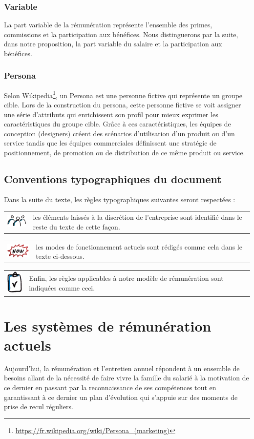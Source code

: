 \documentclass[12pt]{article}
\newcommand{\assemblee}[1]{%
  \begin{tcolorbox}[colframe=DarkPlum,boxrule=2pt,arc=4pt,left=6pt,right=6pt,top=6pt,bottom=6pt,boxsep=0pt,colback=Aluminium1]
    \begin{tabular}{m{1.5cm} m{11cm}}
      \includegraphics[width=1.5cm]{includes/team} & #1 \\
    \end{tabular}
  \end{tcolorbox}
}
\newcommand{\actuel}[1]{%
  \begin{tcolorbox}[colframe=DarkButter,boxrule=2pt,arc=4pt,left=6pt,right=6pt,top=6pt,bottom=6pt,boxsep=0pt,colback=Aluminium1]
    \begin{tabular}{m{1.5cm} m{11cm}}
      \includegraphics[width=1.5cm]{includes/now} & #1 \\
    \end{tabular}
  \end{tcolorbox}
}
\newcommand{\regle}[1]{%
  \begin{tcolorbox}[colframe=DarkOrange,boxrule=2pt,arc=4pt,left=6pt,right=6pt,top=6pt,bottom=6pt,boxsep=0pt,colback=Aluminium1]
    \begin{tabular}{m{1.0cm} m{11.5cm}}
      \includegraphics[width=1.0cm]{includes/rules} & #1 \\
    \end{tabular}
  \end{tcolorbox}
}
\begin{document}
\subsubsection{Variable}
 La part variable de la rémunération représente l’ensemble des primes, commissions et la participation aux bénéfices.
 Nous distinguerons par la suite, dans notre proposition, la part variable du salaire et la participation aux bénéfices.

\subsubsection{Persona}
 Selon Wikipedia\footnote{\url{https://fr.wikipedia.org/wiki/Persona\_(marketing)}}, un Persona est une personne fictive qui représente un groupe cible. Lors de la construction du persona, cette personne fictive se voit assigner une série d'attributs qui enrichissent son profil pour mieux exprimer les caractéristiques du groupe cible. Grâce à ces caractéristiques, les équipes de conception (designers) créent des scénarios d'utilisation d'un produit ou d'un service tandis que les équipes commerciales définissent une stratégie de positionnement, de promotion ou de distribution de ce même produit ou service.

\subsection{Conventions typographiques du document}
  Dans la suite du texte, les règles typographiques suivantes seront respectées :

  \assemblee{les éléments laissés à la discrétion de l'entreprise sont identifié dans le reste du texte de cette façon.}

  \actuel{les modes de fonctionnement actuels sont rédigés comme cela dans le texte ci-dessous.}

  \regle{Enfin, les règles applicables à notre modèle de rémunération sont indiquées comme ceci.}

\section{Les systèmes de rémunération actuels}
 Aujourd’hui, la rémunération et l'entretien annuel répondent à un ensemble de besoins allant de la nécessité de faire vivre la famille du salarié à la motivation de ce dernier en passant par la reconnaissance de ses compétences tout en garantissant à ce dernier un plan d’évolution qui s’appuie sur des moments de prise de recul réguliers.
\end{document}
